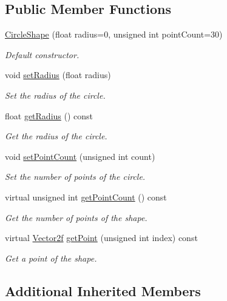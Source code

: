 \subsection*{Public Member Functions}
\begin{DoxyCompactItemize}
\item 
\hyperlink{classsf_1_1CircleShape_a06a5e136da1cfa3bd2a945a5c7f718d3}{Circle\-Shape} (float radius=0, unsigned int point\-Count=30)
\begin{DoxyCompactList}\small\item\em Default constructor. \end{DoxyCompactList}\item 
void \hyperlink{classsf_1_1CircleShape_a21cdf85fc2f201e10222a241af864be0}{set\-Radius} (float radius)
\begin{DoxyCompactList}\small\item\em Set the radius of the circle. \end{DoxyCompactList}\item 
float \hyperlink{classsf_1_1CircleShape_afaf5175a75b6179cc177b1281027ab00}{get\-Radius} () const 
\begin{DoxyCompactList}\small\item\em Get the radius of the circle. \end{DoxyCompactList}\item 
void \hyperlink{classsf_1_1CircleShape_a84249c4b23b20c24bf6891edde3cf744}{set\-Point\-Count} (unsigned int count)
\begin{DoxyCompactList}\small\item\em Set the number of points of the circle. \end{DoxyCompactList}\item 
virtual unsigned int \hyperlink{classsf_1_1CircleShape_ae41ed830ca8f459e88ea6f125c240949}{get\-Point\-Count} () const 
\begin{DoxyCompactList}\small\item\em Get the number of points of the shape. \end{DoxyCompactList}\item 
virtual \hyperlink{classsf_1_1Vector2}{Vector2f} \hyperlink{classsf_1_1CircleShape_a05139deaef220ed3d5a3bc4ca9aa9dbe}{get\-Point} (unsigned int index) const 
\begin{DoxyCompactList}\small\item\em Get a point of the shape. \end{DoxyCompactList}\end{DoxyCompactItemize}
\subsection*{Additional Inherited Members}


